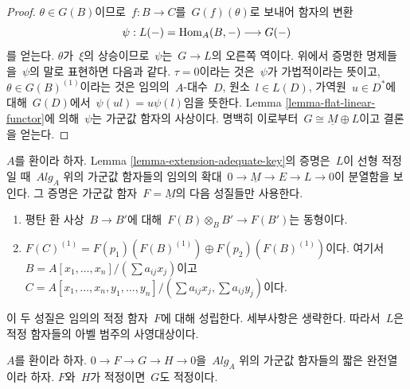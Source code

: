 \begin{proof}
\medskip\noindent
$\theta \in G(B)$이므로\  $f : B \to C$를\  $G(f)(\theta)$로 보내어
함자의 변환
$$
\psi : L(-) = \mathop{\mathrm{Hom}}\nolimits_A(B, - ) \longrightarrow G(-)
$$
를 얻는다. $\theta$가\  $\xi$의 상승이므로\  $\psi$는\  $G \to L$의
오른쪽 역이다. 위에서 증명한 명제들을\  $\psi$의 말로 표현하면 다음과
같다. $\tau = 0$이라는 것은\  $\psi$가 가법적이라는 뜻이고,
$\theta \in G(B)^{(1)}$이라는 것은 임의의\  $A$-대수\  $D$, 원소\ 
$l \in L(D)$, 가역원\  $u \in D^*$에 대해\  $G(D)$에서\ 
$\psi(ul) = u\psi(l)$임을 뜻한다. Lemma
\ref{lemma-flat-linear-functor}에 의해\  $\psi$는 가군값 함자의
사상이다. 명백히 이로부터\  $G \cong \underline{M} \oplus L$이고
결론을 얻는다.
\end{proof}

\begin{remark}
\label{remark-linearly-adequate}
$A$를 환이라 하자. Lemma \ref{lemma-extension-adequate-key}의 증명은\ 
$L$이 선형 적정일 때\  $\textit{Alg}_A$ 위의 가군값 함자들의 임의의
확대\  $0 \to \underline{M} \to E \to L \to 0$이 분열함을 보인다.
그 증명은 가군값 함자\  $F = \underline{M}$의 다음 성질들만 사용한다.
\begin{enumerate}
\item 평탄 환 사상\  $B \to B'$에 대해\ 
$F(B) \otimes_B B' \to F(B')$는 동형이다.
\item
$F(C)^{(1)} = F(p_1)(F(B)^{(1)}) \oplus F(p_2)(F(B)^{(1)})$이다. 여기서\ 
$B = A[x_1, \ldots, x_n]/(\sum a_{ij}x_j)$이고\ 
$C = A[x_1, \ldots, x_n, y_1, \ldots, y_n]/
(\sum a_{ij}x_j, \sum a_{ij}y_j)$이다.
\end{enumerate}
이 두 성질은 임의의 적정 함자\  $F$에 대해 성립한다. 세부사항은
생략한다. 따라서\  $L$은 적정 함자들의 아벨 범주의 사영대상이다.
\end{remark}

\begin{lemma}
\label{lemma-extension-adequate}
$A$를 환이라 하자.
$0 \to F \to G \to H \to 0$을\  $\textit{Alg}_A$ 위의 가군값
함자들의 짧은 완전열이라 하자. $F$와\  $H$가 적정이면\  $G$도 적정이다.
\end{lemma}

